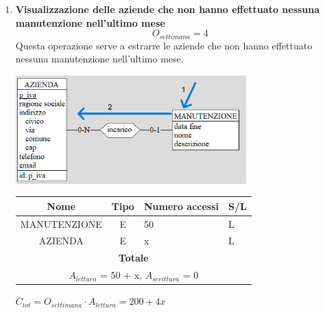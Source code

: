 \documentclass[12pt,a4paper]{report}
\begin{document}
\begin{enumerate}[label=\textbf{\arabic*}]
	\item \textbf{Visualizzazione delle aziende che non hanno effettuato nessuna manutenzione nell’ultimo mese} \label{op17} \\
    \[ {O_{settimana} = 4} \]
    Questa operazione serve a estrarre le aziende che non hanno effettuato nessuna manutenzione nell'ultimo mese.
    \begin{center}
	\includegraphics[width=0.7\textwidth]{op_17}
	\end{center}
    \begin{table}[H]
    \centering
    \begin{tabular}{|c|c|l|l|}
    \hline
    \textbf{Nome} & \textbf{Tipo} & \textbf{Numero accessi} & \textbf{S/L} \\
    \hline
    MANUTENZIONE & E & 50 & L \\
    \hline
    AZIENDA & E & x & L \\
    \hline
    \multicolumn{4}{c}{\textbf{Totale}} \\
    \multicolumn{4}{c}{${A_{lettura}}$ = 50 + x, ${A_{scrittura}}$ = 0} \\
    \hline
    \end{tabular}
    \end{table}
    \begin{center}
    ${C_{tot} = {O_{settimana}}\cdot {A_{lettura}} = 200 + 4x}$
    \end{center}



\end{enumerate}
\end{document}
